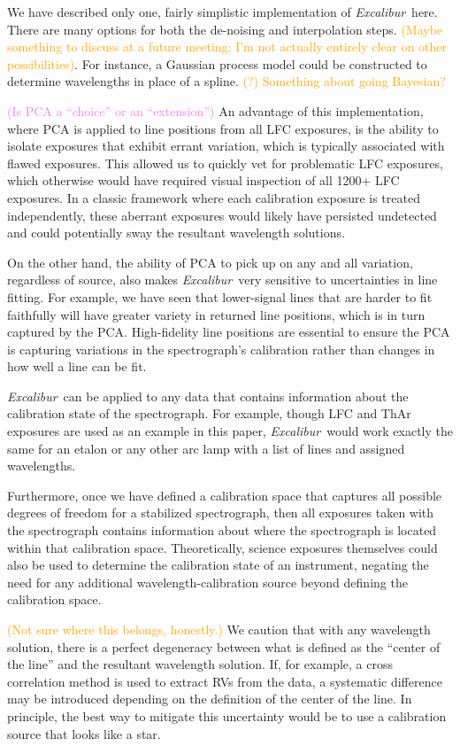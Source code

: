 \documentclass[modern]{aastex63}
\newcommand{\project}[1]{\textsl{#1}}
\newcommand{\name}{\project{Excalibur}}
\newcommand{\lz}[1]{\textcolor{orange}{#1}}
\newcommand{\mb}[1]{\textcolor{violet}{#1}}
\begin{document}
We have described only one, fairly simplistic implementation of \name\ here.  There are many options for both the de-noising and interpolation steps.  \lz{(Maybe something to discuss at a future meeting; I'm not actually entirely clear on other possibilities)}.  For instance, a Gaussian process model could be constructed to determine wavelengths in place of a spline. \lz{(?)}  \lz{Something about going Bayesian?}

\mb{(Is PCA a ``choice'' or an ``extension'')}
An advantage of this implementation, where PCA is applied to line positions from all LFC exposures, is the ability to isolate exposures that exhibit errant variation, which is typically associated with flawed exposures.  This allowed us to quickly vet for problematic LFC exposures, which otherwise would have required visual inspection of all 1200+ LFC exposures.  In a classic framework where each calibration exposure is treated independently, these aberrant exposures would likely have persisted undetected and could potentially sway the resultant wavelength solutions.

On the other hand, the ability of PCA to pick up on any and all variation, regardless of source, also makes \name\ very sensitive to uncertainties in line fitting.  For example, we have seen that lower-signal lines that are harder to fit faithfully will have greater variety in returned line positions, which is in turn captured by the PCA.  High-fidelity line positions are essential to ensure the PCA is capturing variations in the spectrograph's calibration rather than changes in how well a line can be fit.

\name\ can be applied to any data that contains information about the calibration state of the spectrograph.  For example, though LFC and ThAr exposures are used as an example in this paper, \name\ would work exactly the same for an etalon or any other arc lamp with a list of lines and assigned wavelengths.

Furthermore, once we have defined a calibration space that captures all possible degrees of freedom for a stabilized spectrograph, then all exposures taken with the spectrograph contains information about where the spectrograph is located within that calibration space.  Theoretically, science exposures themselves could also be used to determine the calibration state of an instrument, negating the need for any additional wavelength-calibration source beyond defining the calibration space.

\lz{(Not sure where this belongs, honestly.)}  We caution that with any wavelength solution, there is a perfect degeneracy between what is defined as the ``center of the line'' and the resultant wavelength solution.  If, for example, a cross correlation method is used to extract RVs from the data, a systematic difference may be introduced depending on the definition of the center of the line.  In principle, the best way to mitigate this uncertainty would be to use a calibration source that looks like a star.
\end{document}
